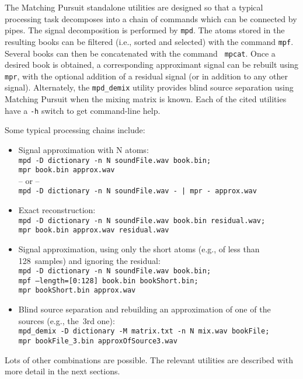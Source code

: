 \documentclass[11pt,a4paper]{article}
\begin{document}
The Matching Pursuit standalone utilities are designed so that a typical
processing task decomposes into a chain of commands which can be connected by
pipes. The signal decomposition is performed by {\tt mpd}. The atoms stored in
the resulting books can be filtered (i.e., sorted and selected) with the
command {\tt mpf}. Several books can then be concatenated with the command {\tt
  mpcat}. Once a desired book is obtained, a corresponding approximant signal
can be rebuilt using {\tt mpr}, with the optional addition of a residual signal
(or in addition to any other signal). Alternately, the {\tt mpd\_demix} utility
provides blind source separation using Matching Pursuit when the mixing matrix
is known. Each of the cited utilities have a {\tt -h} switch to get
command-line help.

\smallskip

Some typical processing chains include:
\begin{itemize}
\item Signal approximation with N atoms: \\
      \mbox{\tt mpd -D dictionary -n N soundFile.wav book.bin;} \\
      \mbox{\tt mpr book.bin approx.wav} \\
      -- or -- \\
      \mbox{\tt mpd -D dictionary -n N soundFile.wav - | mpr - approx.wav}
\item Exact reconstruction: \\
      \mbox{\tt mpd -D dictionary -n N soundFile.wav book.bin residual.wav;} \\
      \mbox{\tt mpr book.bin approx.wav residual.wav}
\item Signal approximation, using only the short atoms (e.g., of less than
128~samples) \linebreak and ignoring the residual: \\
      \mbox{\tt mpd -D dictionary -n N soundFile.wav book.bin;} \\
      \mbox{\tt mpf --length=[0:128] book.bin bookShort.bin;} \\
      \mbox{\tt mpr bookShort.bin approx.wav}
\item Blind source separation and rebuilding an approximation of one of the
  sources (e.g., the~3rd one): \\
      \mbox{\tt mpd\_demix -D dictionary -M matrix.txt -n N mix.wav bookFile;} \\
      \mbox{\tt mpr bookFile\_3.bin approxOfSource3.wav}
\end{itemize}
Lots of other combinations are possible. The relevant utilities are described
with more detail in the next sections.
\end{document}
